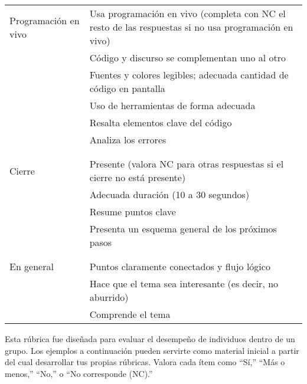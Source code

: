 \begin{longtable}{p{}p{}}
  Programación en vivo
  & Usa programación en vivo (completa con NC el resto de las respuestas si no usa programación en vivo) \\
  & Código y discurso se complementan uno al otro\\
  & Fuentes y colores legibles; adecuada cantidad de código en pantalla \\
  & Uso de herramientas de forma adecuada \\
  & Resalta elementos clave del código \\
  & Analiza los errores \\
  \\ [-1.5ex] \hline \\ [-1.5ex]

  Cierre
  & Presente (valora NC para otras respuestas si el cierre no está presente) \\
  & Adecuada duración (10 a 30 segundos) \\
  & Resume puntos clave \\
  & Presenta un esquema general de los próximos pasos \\
  \\ [-1.5ex] \hline \\ [-1.5ex]

  En general
  & Puntos claramente conectados y flujo lógico \\
  & Hace que el tema sea interesante (es decir, no aburrido) \\
  & Comprende el tema \\

\end{longtable}


Esta rúbrica fue diseñada para evaluar el desempeño de individuos dentro de un grupo. 
Los ejemplos a continuación pueden servirte como material inicial a partir del cual desarrollar tus propias rúbricas. 
Valora cada ítem como ``Sí,'' ``Más o menos,'' ``No,'' o ``No corresponde (NC).''

